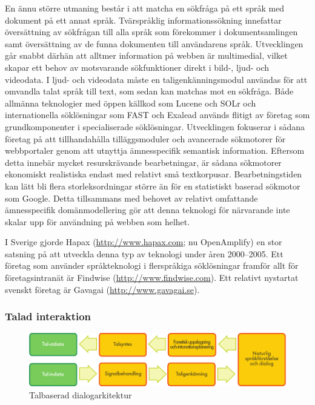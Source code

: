 \begin{multicols}{2}
En ännu större utmaning består i att matcha en sökfråga på ett språk
med dokument på ett annat språk. Tvärspråklig informationssökning
innefattar översättning av sökfrågan till alla språk som förekommer i
dokumentsamlingen samt översättning av de funna dokumenten till
användarens språk. Utvecklingen går snabbt därhän att alltmer information på webben är
multimedial, vilket skapar ett behov av motsvarande sökfunktioner
direkt i bild-, ljud- och vi\-deo\-data. I ljud- och vi\-deo\-data måste en
taligenkänningsmodul användas för att omvandla talat språk till text,
som sedan kan matchas mot en sökfråga. Både allmänna teknologier med öppen källkod som Lucene och SOLr och
internationella söklösningar som FAST och Exalead används flitigt av
företag som grundkomponenter i specialiserade sök\-lös\-ning\-ar. Utvecklingen fokuserar i sådana företag på att tillhandahålla
tilläggsmoduler och avancerade sökmotorer för webbportaler genom att
utnyttja ämnesspecifik semantisk information. Eftersom detta innebär
mycket resurskrävande bearbetningar, är sådana sökmotorer ekonomiskt
realistiska endast med relativt små textkorpusar. Bearbetningstiden
kan lätt bli flera storleksordningar större än för en statistiskt
baserad sökmotor som Google. Detta tillsammans med behovet av relativt
omfattande ämnesspecifik domänmodellering gör att denna teknologi för
närvarande inte skalar upp för användning på webben som helhet.

I Sverige gjorde Hapax (\url{http://www.hapax.com}; nu Open\-Amplify) en
stor satsning på att utveckla denna typ av teknologi under åren
2000--2005. Ett företag som använder språkteknologi i fler\-språkiga
sök\-lösningar framför allt för företags\-intra\-nät är Findwise
(\url{http://www.findwise.com}). Ett relativt nystartat svenskt
företag är Gavagai (\url{http://www.gavagai.se}).


\subsubsection{Talad interaktion}

\begin{figure}[htb]
  \center 
  \includegraphics[width=\textwidth]{../_media/swedish/simple_speech-based_dialogue_architecture}
  \caption{Talbaserad dialogarkitektur}
  \label{fig:dialoguearch_sv}
\end{figure}


\end{multicols}
